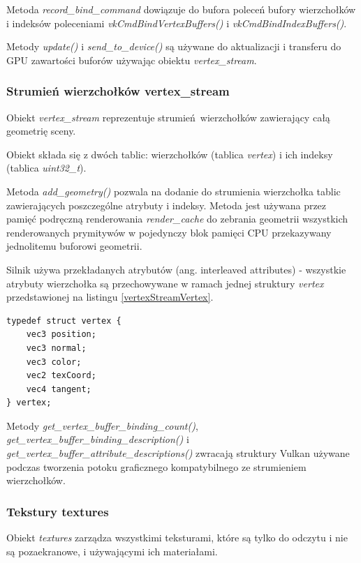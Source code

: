 Metoda \textit{record\_bind\_command} dowiązuje do bufora poleceń bufory wierzchołków i indeksów poleceniami \textit{vkCmdBindVertexBuffers()} i \textit{vkCmdBindIndexBuffers()}.

Metody \textit{update()} i \textit{send\_to\_device()} są używane do aktualizacji i transferu do GPU zawartości buforów używając obiektu \textit{vertex\_stream}.


\subsubsection{Strumień wierzchołków vertex\_stream}
Obiekt \textit{vertex\_stream} reprezentuje strumień wierzchołków zawierający całą geometrię sceny.

Obiekt składa się z dwóch tablic: wierzchołków (tablica \textit{vertex}) i ich indeksy (tablica \textit{uint32\_t}).

Metoda \textit{add\_geometry()} pozwala na dodanie do strumienia wierzchołka tablic zawierających poszczególne atrybuty i indeksy.
Metoda jest używana przez pamięć podręczną renderowania \textit{render\_cache} do zebrania geometrii wszystkich renderowanych prymitywów w pojedynczy blok pamięci CPU przekazywany jednolitemu buforowi geometrii.

Silnik używa przekładanych atrybutów (ang. interleaved attributes) - wszystkie atrybuty wierzchołka są przechowywane w ramach jednej struktury \textit{vertex} przedstawionej na listingu \ref{vertexStreamVertex}.
\lstset{language=C}
\begin{lstlisting}[caption={Struktura wierzchołka \textit{vertex}},captionpos=b,label={vertexStreamVertex}]
typedef struct vertex {
	vec3 position;
	vec3 normal;
	vec3 color;
	vec2 texCoord;
	vec4 tangent;
} vertex;
\end{lstlisting}

Metody \textit{get\_vertex\_buffer\_binding\_count()}, \textit{get\_vertex\_buffer\_binding\_description()} i \textit{get\_vertex\_buffer\_attribute\_descriptions()} zwracają struktury Vulkan używane podczas tworzenia potoku graficznego kompatybilnego ze strumieniem wierzchołków.


\subsubsection{Tekstury textures}
Obiekt \textit{textures} zarządza wszystkimi teksturami, które są tylko do odczytu i nie są pozaekranowe, i używającymi ich materiałami.

